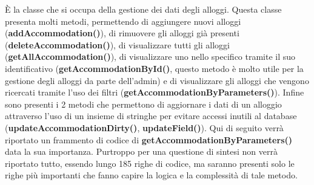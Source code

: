 \documentclass[10pt]{article}
\begin{document}
\`E la classe che si occupa della gestione dei dati degli alloggi. Questa classe presenta molti metodi, permettendo di aggiungere nuovi alloggi \newline(\textbf{addAccommodation()}), di rimuovere gli alloggi gi\`a presenti \newline(\textbf{deleteAccommodation()}), di visualizzare tutti gli alloggi
\newline(\textbf{getAllAccommodation()}), di visualizzare uno nello specifico tramite il suo identificativo (\textbf{getAccommodationById()}, questo metodo \`e molto utile per la gestione degli alloggi da parte dell'admin) e di visualizzare gli alloggi che vengono ricercati tramite l'uso dei filtri (\textbf{getAccommodationByParameters()}). Infine sono presenti i 2 metodi che permettono di aggiornare i dati di un alloggio attraverso l'uso di un insieme di stringhe per evitare accessi inutili al database (\textbf{updateAccommodationDirty()}, \textbf{updateField()}).
Qui di seguito verr\`a riportato un frammento di codice di \textbf{getAccommodationByParameters()} data la sua importanza. Purtroppo per una questione di sintesi non verr\`a riportato tutto, essendo lungo 185 righe di codice, ma saranno presenti solo le righe pi\`u importanti che fanno capire la logica e la complessità di tale metodo.
\end{document}
